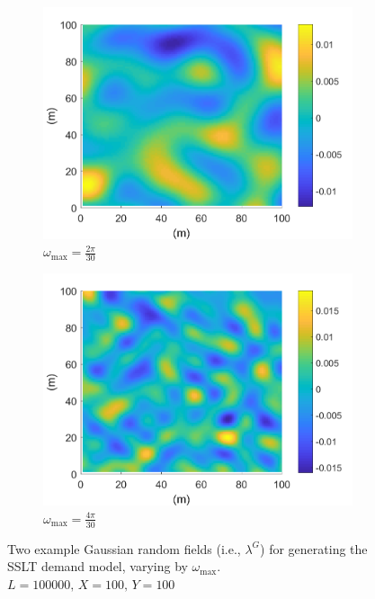 \documentclass[12pt,dvipsnames]{report}
\begin{document}
\begin{figure}[!ht]
\centering
\begin{subfigure}{.45\textwidth}
	\centering
	\includegraphics[width=1\linewidth]{lambdaG_O2pi-300_L100000_X100_Y100}
	\caption{\small $\omega_{\max}=\frac{2 \pi}{30}$}
	\label{fig:lambdaG_2pi-300}
\end{subfigure}
\hspace{0.5cm}
\begin{subfigure}{.45\textwidth}
	\centering
	\includegraphics[width=1\linewidth]{lambdaG_O4pi-300_L100000_X100_Y100}
	\caption{\small $\omega_{\max}=\frac{4 \pi}{30}$}
	\label{fig:lambdaG_4pi-300}
\end{subfigure}
\caption[Example Gaussian random fields for SSLT demand model generation]{\small Two example Gaussian random fields (i.e., $\lambda^G$) for generating the SSLT demand model, varying by $\omega_{\max}$.  $L = 100000,\, X = 100,\, Y = 100$}
\label{fig:lambdaG}
\end{figure}
\end{document}
